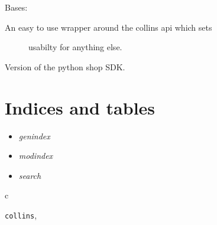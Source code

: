 \documentclass[letterpaper,10pt,english]{sphinxmanual}
\begin{document}
\begin{fulllineitems}

\begin{fulllineitems}
\label{collins:collins.Constants.TYPE_CATEGORIES}
\end{fulllineitems}


\begin{fulllineitems}
\label{collins:collins.Constants.TYPE_PRODUCTS}
\end{fulllineitems}


\end{fulllineitems}


\begin{fulllineitems}
\label{collins:collins.EasyCollins}
Bases: 
\begin{description}
\item[{An easy to use wrapper around the collins api which sets}] \leavevmode
usabilty for anything else.

\end{description}

\end{fulllineitems}


\begin{fulllineitems}
\label{collins:collins.VERSION}
Version of the python shop SDK.

\end{fulllineitems}



\chapter{Indices and tables}
\label{index:indices-and-tables}\begin{itemize}
\item {} 
\emph{genindex}

\item {} 
\emph{modindex}

\item {} 
\emph{search}

\end{itemize}


\renewcommand{\indexname}{Python Module Index}
\begin{theindex}
\def\bigletter#1{{\Large\sffamily#1}\nopagebreak\vspace{1mm}}
\bigletter{c}
\item {\texttt{collins}}, \pageref{collins:module-collins}
\end{theindex}

\renewcommand{\indexname}{Index}
\printindex
\end{document}
